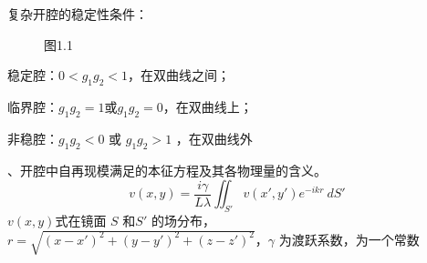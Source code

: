\documentclass[12pt]{article}
\begin{document}
{\kaishu
复杂开腔的稳定性条件：

\begin{figure}[H]
\begin{center}
\end{center}
\caption*{图1.1}%
\end{figure}
\par 稳定腔：$ 0 < g_1g_2 < 1$，在双曲线之间；
\par 临界腔：$  g_1g_2 = 1$或$g_1g_2=0$，在双曲线上；
\par 非稳腔：$g_1g_2<0$ 或 $g_1g_2>1$ ，在双曲线外
\\


}

{、开腔中自再现模满足的本征方程及其各物理量的含义。
}
{\kaishu
\begin{equation*}
	v(x,y)=\frac{i\gamma}{L\lambda} \iint_{{S'}}^{{}} {v(x',y')e^{-ikr}} \: d{S'} {}
\end{equation*}
$v(x,y)$式在镜面 $S$ 和$S'$ 的场分布， $r=\sqrt{(x-x')^2+(y-y')^2+(z-z')^2}$，$\gamma$ 为渡跃系数，为一个常数
\\}
\end{document}
